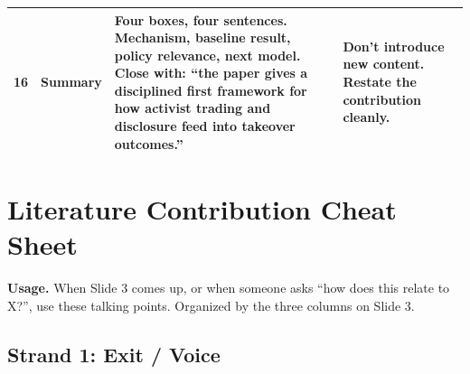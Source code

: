 \documentclass[9pt,a4paper]{extarticle}
\newcommand{\say}[1]{\textbf{#1}}
\newcommand{\avoid}[1]{\textcolor{ptrose}{#1}}
\begin{document}
{\begin{longtable}{@{}P{0.06\textwidth}P{0.14\textwidth}P{0.35\textwidth}P{0.37\textwidth}@{}}
16 & Summary &
\say{Four boxes, four sentences.} Mechanism, baseline result, policy relevance, next model. Close with: ``the paper gives a disciplined first framework for how activist trading and disclosure feed into takeover outcomes.'' &
\avoid{Don't introduce new content.} Restate the contribution cleanly. \\
\bottomrule
\end{longtable}
}

\section{Literature Contribution Cheat Sheet}

\textbf{Usage.} When Slide 3 comes up, or when someone asks ``how does this relate to X?'', use these talking points. Organized by the three columns on Slide 3.

\subsection{Strand 1: Exit / Voice}
\end{document}

